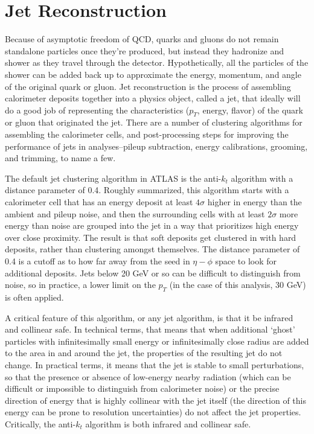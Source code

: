 \section{Jet Reconstruction}
Because of asymptotic freedom of QCD, quarks and gluons do not remain standalone particles once they're produced, but instead they hadronize and shower as they travel through the detector.  Hypothetically, all the particles of the shower can be added back up to approximate the energy, momentum, and angle of the original quark or gluon.  Jet reconstruction is the process of assembling calorimeter deposits together into a physics object, called a jet, that ideally will do a good job of representing the characteristics ($p_T$, energy, flavor) of the quark or gluon that originated the jet.  There are a number of clustering algorithms for assembling the calorimeter cells, and post-processing steps for improving the performance of jets in analyses--pileup subtraction, energy calibrations, grooming, and trimming, to name a few.  

The default jet clustering algorithm in ATLAS is the anti-$k_t$ algorithm with a distance parameter of 0.4.  Roughly summarized, this algorithm starts with a calorimeter cell that has an energy deposit at least $4\sigma$ higher in energy than the ambient and pileup noise, and then the surrounding cells with at least $2\sigma$ more energy than noise are grouped into the jet in a way that prioritizes high energy over close proximity.  The result is that soft deposits get clustered in with hard deposits, rather than clustering amongst themselves.  The distance parameter of 0.4 is a cutoff as to how far away from the seed in $\eta-\phi$ space to look for additional deposits.   Jets below 20 GeV or so can be difficult to distinguish from noise, so in practice, a lower limit on the $p_T$ (in the case of this analysis, 30 GeV) is often applied.  

A critical feature of this algorithm, or any jet algorithm, is that it be infrared and collinear safe.  In technical terms, that means that when additional `ghost' particles with infinitesimally small energy or infinitesimally close radius are added to the area in and around the jet, the properties of the resulting jet do not change.  In practical terms, it means that the jet is stable to small perturbations, so that the presence or absence of low-energy nearby radiation (which can be difficult or impossible to distinguish from calorimeter noise) or the precise direction of energy that is highly collinear with the jet itself (the direction of this energy can be prone to resolution uncertainties) do not affect the jet properties.  Critically, the anti-$k_t$ algorithm is both infrared and collinear safe.







